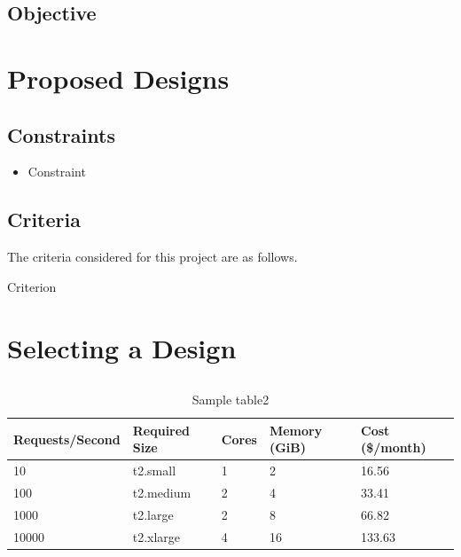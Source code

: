 \documentclass[letterpaper,12pt]{article}
\begin{document}
\subsection{Objective}

\section{Proposed Designs}

\subsection{Constraints}

\begin{itemize}
    \item Constraint
\end{itemize}

\subsection{Criteria}
The criteria considered for this project are as follows.
\begin{itemize}
    \itme Criterion
\end{itemize}

\section{Selecting a Design}
\subsection{}

\begin{table}[H]
	\begin{center}
		\caption{Sample table2}
        \label{tab:sampletable}
        \begin{tabular}{l|l|l|l|l}
        Requests/Second & Required Size & Cores & Memory (GiB) & Cost (\$/month)\\
        \hline
        10 & t2.small & 1 & 2 & 16.56\\
        100 & t2.medium & 2 & 4 & 33.41\\
        1000 & t2.large & 2 & 8 & 66.82\\
        10000 & t2.xlarge & 4 & 16 & 133.63\\
        \end{tabular}
	\end{center}
\end{table}
\end{document}
